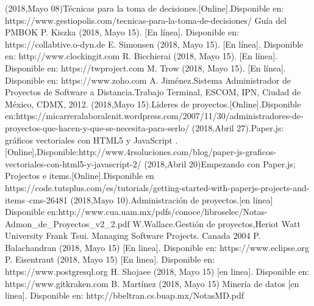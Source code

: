 \begin{thebibliography}{1000}
  (2018,Mayo 08)Técnicas para la toma de decisiones.[Online].Disponible en: https://www.gestiopolis.com/tecnicas-para-la-toma-de-decisiones/ 
  Guía del PMBOK 
  P. Kiszka (2018, Mayo 15). [En línea]. Disponible en: https://collabtive.o-dyn.de
  E. Simonsen (2018, Mayo 15). [En línea]. Disponible en: http://www.clockingit.com
  R. Bicchierai (2018, Mayo 15). [En línea]. Disponible en: https://twproject.com 
  M. Trow (2018, Mayo 15). [En línea]. Disponible en: https://www.zoho.com 
  A. Jiménez.Sistema Administrador de Proyectos de Software a Distancia.Trabajo Terminal, ESCOM, IPN, Ciudad de México, CDMX, 2012. 
  (2018,Mayo 15).Líderes de proyectos.[Online].Disponible en:https://micarreralaboralenit.wordpress.com/2007/11/30/administradores-de-proyectos-que-hacen-y-que-se-necesita-para-serlo/ 
  (2018,Abril 27).Paper.js: gráficos vectoriales con HTML5 y JavaScript .[Online],Disponible:http://www.4rsoluciones.com/blog/paper-js-graficos-vectoriales-con-html5-y-javascript-2/ 
  (2018,Abril 20)Empezando con Paper.js; Projectos e items.[Online].Disponible en https://code.tutsplus.com/es/tutorials/getting-started-with-paperjs-projects-and-items--cms-26481 
  (2018,Mayo 10).Administración de proyectos.[en linea] Disponible en:http://www.cua.uam.mx/pdfs/conoce/libroselec/Notas-Admon\_de\_Proyectos\_v2\_2.pdf 
  W.Wallace.Gestión de proyectos,Heriot Watt University
  Frank Tsui. Managing Software Projects. Canada 2004
   P. Balachandran (2018, Mayo 15) [En linea]. Disponible en: https://www.eclipse.org 
  P. Eisentraut (2018, Mayo 15) [En linea]. Disponible en: https://www.postgresql.org 
  H. Shojaee (2018, Mayo 15) [en linea]. Disponible en: https://www.gitkraken.com 
  B. Martínez (2018, Mayo 15) Minería de datos [en linea]. Disponible en: http://bbeltran.cs.buap.mx/NotasMD.pdf 
\end{thebibliography}



